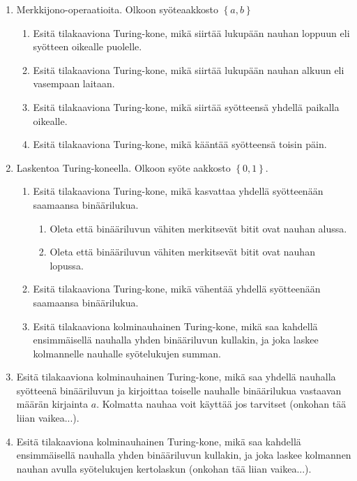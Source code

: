 \documentclass[finnish,11pt,draft]{article}
\newcommand{\set}[1]{{\left\{ #1 \right\}}}
\begin{document}
\begin{enumerate}
\item
  Merkkijono-operaatioita. Olkoon syöteaakkosto $\set{a,b}$
  \begin{enumerate}
  \item 
    Esitä tilakaaviona Turing-kone, mikä siirtää lukupään nauhan loppuun eli
    syötteen oikealle puolelle.
  \item
    Esitä tilakaaviona Turing-kone, mikä siirtää lukupään nauhan alkuun eli
    vasempaan laitaan.
  \item
    Esitä tilakaaviona Turing-kone, mikä siirtää syötteensä yhdellä paikalla
    oikealle.
  \item
    Esitä tilakaaviona Turing-kone, mikä kääntää syötteensä toisin päin.
  \end{enumerate}

\item
  Laskentoa Turing-koneella. Olkoon syöte aakkosto $\set{0,1}$.
  \begin{enumerate}
  \item
    Esitä tilakaaviona Turing-kone, mikä kasvattaa yhdellä syötteenään
    saamaansa binäärilukua.
    \begin{enumerate}
    \item
      Oleta että binääriluvun vähiten merkitsevät bitit ovat nauhan alussa.
    \item
      Oleta että binääriluvun vähiten merkitsevät bitit ovat nauhan lopussa.
    \end{enumerate}
  \item
    Esitä tilakaaviona Turing-kone, mikä vähentää yhdellä syötteenään
    saamaansa binäärilukua.
  \item
    Esitä tilakaaviona kolminauhainen Turing-kone, mikä saa kahdellä
    ensimmäisellä nauhalla yhden binääriluvun kullakin, ja joka laskee
    kolmannelle nauhalle syötelukujen summan.
  \end{enumerate}

\item 
  Esitä tilakaaviona kolminauhainen Turing-kone, mikä saa yhdellä nauhalla
  syötteenä binääriluvun ja kirjoittaa toiselle nauhalle binäärilukua
  vastaavan määrän kirjainta $a$. Kolmatta nauhaa voit käyttää jos tarvitset
  (onkohan tää liian vaikea...).

\item
  Esitä tilakaaviona kolminauhainen Turing-kone, mikä saa kahdellä
  ensimmäisellä nauhalla yhden binääriluvun kullakin, ja joka laskee kolmannen
  nauhan avulla syötelukujen kertolaskun (onkohan tää liian vaikea...).
\end{enumerate}




\end{document}
